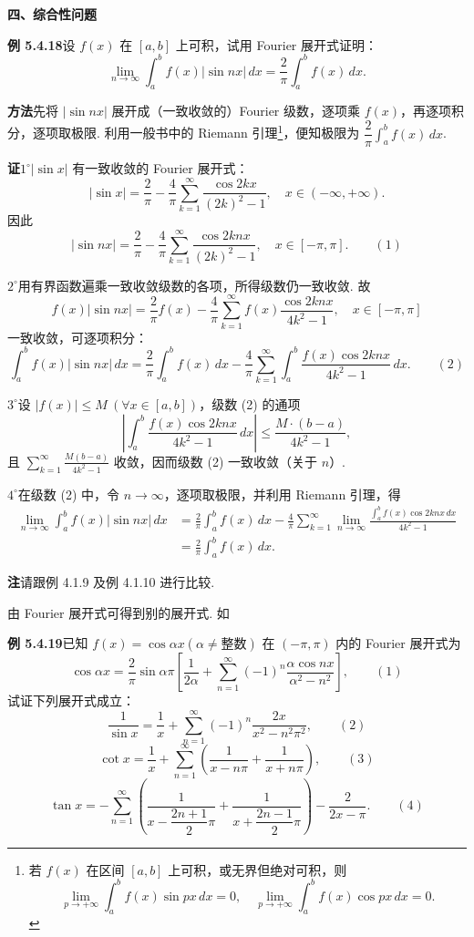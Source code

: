 \documentclass[UTF8, 12pt, fontset=fandol, oneside]{ctexart}
\begin{document}
\noindent\textbf{四、综合性问题}

\noindent\textbf{例 5.4.18}\quad 设 $f(x)$ 在 $[a,b]$ 上可积，试用 Fourier 展开式证明：
\[
  \lim_{n\to\infty}\int_a^b f(x)|\sin nx|\,dx
  =\frac2\pi\int_a^b f(x)\,dx.
\]

\noindent\textbf{方法}\quad 先将 $|\sin nx|$ 展开成（一致收敛的）Fourier 级数，逐项乘 $f(x)$，再逐项积分，逐项取极限. 利用一般书中的 Riemann 引理\footnote{若 $f(x)$ 在区间 $[a,b]$ 上可积，或无界但绝对可积，则
\[
  \lim_{p\to+\infty}\int_a^b f(x)\sin px\,dx=0,\quad
  \lim_{p\to+\infty}\int_a^b f(x)\cos px\,dx=0.
\]
}，便知极限为 $\dfrac2\pi\displaystyle\int_a^b f(x)\,dx$.

\noindent\textbf{证}\quad $1^\circ$\quad $|\sin x|$ 有一致收敛的 Fourier 展开式：
\[
  |\sin x|=\frac2\pi-\frac4\pi\sum_{k=1}^{\infty}\frac{\cos 2kx}{(2k)^2-1},\quad x\in(-\infty,+\infty).
\]
因此
\[
  |\sin nx|=\frac2\pi-\frac4\pi\sum_{k=1}^{\infty}\frac{\cos 2knx}{(2k)^2-1},\quad x\in[-\pi,\pi]. \qquad(1)
\]

$2^\circ$\quad 用有界函数遍乘一致收敛级数的各项，所得级数仍一致收敛. 故
\[
  f(x)|\sin nx|
  =\frac2\pi f(x)-\frac4\pi\sum_{k=1}^{\infty}f(x)\frac{\cos 2knx}{4k^2-1},\quad x\in[-\pi,\pi]
\]
一致收敛，可逐项积分：
\[
  \int_a^b f(x)|\sin nx|\,dx
  =\frac2\pi\int_a^b f(x)\,dx
  -\frac4\pi\sum_{k=1}^{\infty}\int_a^b\frac{f(x)\cos 2knx}{4k^2-1}\,dx. \qquad(2)
\]

$3^\circ$\quad 设 $|f(x)|\le M\ (\forall x\in[a,b])$，级数 (2) 的通项
\[
  \left|\int_a^b\frac{f(x)\cos 2knx}{4k^2-1}\,dx\right|
  \le\frac{M\cdot(b-a)}{4k^2-1},
\]
且 $\displaystyle\sum_{k=1}^{\infty}\frac{M(b-a)}{4k^2-1}$ 收敛，因而级数 (2) 一致收敛（关于 $n$）.

$4^\circ$\quad 在级数 (2) 中，令 $n\to\infty$，逐项取极限，并利用 Riemann 引理，得
\[
\begin{aligned}
\lim_{n\to\infty}\int_a^b f(x)|\sin nx|\,dx
&=\frac2\pi\int_a^b f(x)\,dx
-\frac4\pi\sum_{k=1}^{\infty}\lim_{n\to\infty}
\frac{\displaystyle\int_a^b f(x)\cos 2knx\,dx}{4k^2-1}\\
&=\frac2\pi\int_a^b f(x)\,dx.
\end{aligned}
\]

\noindent\textbf{注}\quad 请跟例 4.1.9 及例 4.1.10 进行比较.

由 Fourier 展开式可得到别的展开式. 如

\noindent\textbf{例 5.4.19}\quad 已知 $f(x)=\cos\alpha x(\alpha\ne\text{整数})$ 在 $(-\pi,\pi)$ 内的 Fourier 展开式为
\[
  \cos\alpha x=\frac2\pi\sin\alpha\pi
  \left[\frac1{2\alpha}+\sum_{n=1}^{\infty}(-1)^n\frac{\alpha\cos nx}{\alpha^2-n^2}\right], \qquad(1)
\]
试证下列展开式成立：
\[
  \frac1{\sin x}=\frac1x+\sum_{n=1}^{\infty}(-1)^n\frac{2x}{x^2-n^2\pi^2}, \qquad(2)
\]
\[
  \cot x=\frac1x+\sum_{n=1}^{\infty}\left(\frac1{x-n\pi}+\frac1{x+n\pi}\right), \qquad(3)
\]
\[
  \tan x=-\sum_{n=1}^{\infty}\left(\frac1{x-\dfrac{2n+1}{2}\pi}
  +\frac1{x+\dfrac{2n-1}{2}\pi}\right)-\frac2{2x-\pi}. \qquad(4)
\]
\end{document}
